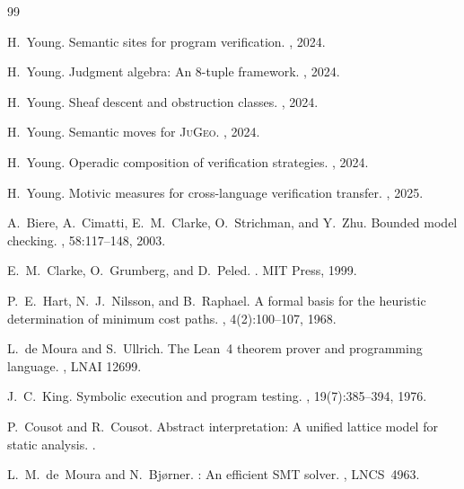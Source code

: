 \documentclass[11pt]{article}
\begin{document}
\begin{thebibliography}{99}

H.~Young.
\newblock Semantic sites for program verification.
, 2024.

H.~Young.
\newblock Judgment algebra: An 8-tuple framework.
, 2024.

H.~Young.
\newblock Sheaf descent and obstruction classes.
, 2024.

H.~Young.
\newblock Semantic moves for \textsc{JuGeo}.
, 2024.

H.~Young.
\newblock Operadic composition of verification strategies.
, 2024.

H.~Young.
\newblock Motivic measures for cross-language verification transfer.
, 2025.

A.~Biere, A.~Cimatti, E.~M.~Clarke, O.~Strichman, and Y.~Zhu.
\newblock Bounded model checking.
, 58:117--148, 2003.

E.~M.~Clarke, O.~Grumberg, and D.~Peled.
.
\newblock MIT Press, 1999.

P.~E.~Hart, N.~J.~Nilsson, and B.~Raphael.
\newblock A formal basis for the heuristic determination of minimum cost paths.
, 4(2):100--107, 1968.

L.~de Moura and S.~Ullrich.
\newblock The {Lean~4} theorem prover and programming language.
, LNAI 12699.

J.~C.~King.
\newblock Symbolic execution and program testing.
, 19(7):385--394, 1976.

P.~Cousot and R.~Cousot.
\newblock Abstract interpretation: A unified lattice model for static analysis.
.

L.~M.~de~Moura and N.~Bj{\o}rner.
: An efficient {SMT} solver.
, LNCS~4963.

\end{thebibliography}
\end{document}
